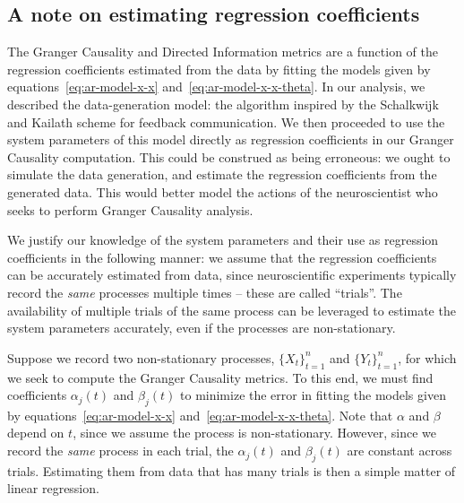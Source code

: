 \documentclass[letterpaper, 10pt, conference]{ieeeconf}
\begin{document}

\subsection{A note on estimating regression coefficients}
\label{sec:estimating-ar-coeffs}

The Granger Causality and Directed Information metrics are a function of the regression coefficients estimated from the data by fitting the models given by equations~\eqref{eq:ar-model-x-x} and~\eqref{eq:ar-model-x-x-theta}. In our analysis, we described the data-generation model: the algorithm inspired by the Schalkwijk and Kailath scheme for feedback communication. We then proceeded to use the system parameters of this model directly as regression coefficients in our Granger Causality computation. This could be construed as being erroneous: we ought to simulate the data generation, and estimate the regression coefficients from the generated data. This would better model the actions of the neuroscientist who seeks to perform Granger Causality analysis.

We justify our knowledge of the system parameters and their use as regression coefficients in the following manner: we assume that the regression coefficients can be accurately estimated from data, since neuroscientific experiments typically record the \emph{same} processes multiple times -- these are called ``trials''. The availability of multiple trials of the same process can be leveraged to estimate the system parameters accurately, even if the processes are non-stationary.

Suppose we record two non-stationary processes, $\{X_t\}_{t=1}^n$ and $\{Y_t\}_{t=1}^n$, for which we seek to compute the Granger Causality metrics. To this end, we must find coefficients $\alpha_j(t)$ and $\beta_j(t)$ to minimize the error in fitting the models given by equations~\eqref{eq:ar-model-x-x} and~\eqref{eq:ar-model-x-x-theta}. Note that $\alpha$ and $\beta$ depend on $t$, since we assume the process is non-stationary. However, since we record the \emph{same} process in each trial, the $\alpha_j(t)$ and $\beta_j(t)$ are constant across trials. Estimating them from data that has many trials is then a simple matter of linear regression.
\end{document}
